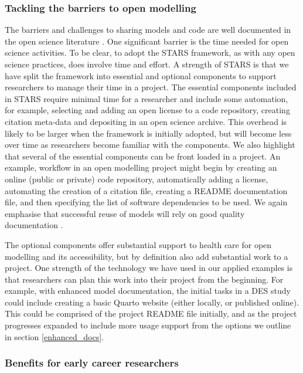\documentclass[]{interact}
\theoremstyle{plain}%
\theoremstyle{definition}
\theoremstyle{remark}
\begin{document}
\subsubsection{Tackling the barriers to open modelling}
The barriers and challenges to sharing models and code are well documented in the open science literature \citep{gomes2022don, hrynaszkiewicz2021survey, celi2019plos, goldacre2019researchers, rrepo24866}. One significant barrier is the time needed for open science activities. To be clear, to adopt the STARS framework, as with any open science practices, does involve time and effort. A strength of STARS is that we have split the framework into essential and optional components to support researchers to manage their time in a project. The essential components included in STARS require minimal time for a researcher and include some automation, for example, selecting and adding an open license to a code repository, creating citation meta-data and depositing in an open science archive.  This overhead is likely to be larger when the framework is initially adopted, but will become less over time as researchers become familiar with the components.  We also highlight that several of the essential components can be front loaded in a project.  An example, workflow in an open modelling project might begin by creating an online (public or private) code repository, automatically adding a license, automating the creation of a citation file, creating a README documentation file, and then specifying the list of software dependencies to be used.  We again emphasise that successful reuse of models will rely on good quality documentation  \citep{rrepo24866}.  

The optional components offer substantial support to health care for open modelling and its accessibility, but by definition also add substantial work to a project. One strength of the technology we have used in our applied examples is that researchers can plan this work into their project from the beginning. For example, with enhanced model documentation, the initial tasks in a DES study could include creating a basic Quarto website (either locally, or published online). This could be comprised of the project README file initially, and as the project progresses expanded to include more usage support from the options we outline in section \ref{enhanced_docs}.


\subsubsection{Benefits for early career researchers}
\end{document}
